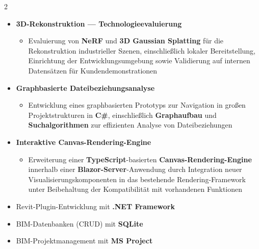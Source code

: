 \documentclass[10pt,a4paper,withhyper]{../altacv}
\begin{document}
\begin{paracol}{2}
  \vspace{0.5em}


  \vspace{0.5em}

  \begin{itemize}
    \item \textbf{3D-Rekonstruktion — Technologieevaluierung}
          \begin{itemize}
            \item Evaluierung von \textbf{NeRF} und \textbf{3D Gaussian Splatting} für die Rekonstruktion industrieller Szenen, einschließlich lokaler Bereitstellung, Einrichtung der Entwicklungsumgebung sowie Validierung auf internen Datensätzen für Kundendemonstrationen
          \end{itemize}
    \item \textbf{Graphbasierte Dateibeziehungsanalyse}
          \begin{itemize}
            \item Entwicklung eines graphbasierten Prototyps zur Navigation in großen Projektstrukturen in \textbf{C\#}, einschließlich \textbf{Graphaufbau} und \textbf{Suchalgorithmen} zur effizienten Analyse von Dateibeziehungen
          \end{itemize}
    \item \textbf{Interaktive Canvas-Rendering-Engine}
          \begin{itemize}
            \item Erweiterung einer \textbf{TypeScript}-basierten \textbf{Canvas-Rendering-Engine} innerhalb einer \textbf{Blazor-Server}-Anwendung durch Integration neuer Visualisierungskomponenten in das bestehende Rendering-Framework unter Beibehaltung der Kompatibilität mit vorhandenen Funktionen
          \end{itemize}
  \end{itemize}




  \begin{itemize}
    \item Revit-Plugin-Entwicklung mit \textbf{.NET Framework}
    \item BIM-Datenbanken (CRUD) mit \textbf{SQLite}
    \item BIM-Projektmanagement mit \textbf{MS Project}
  \end{itemize}


\end{paracol}
\end{document}
